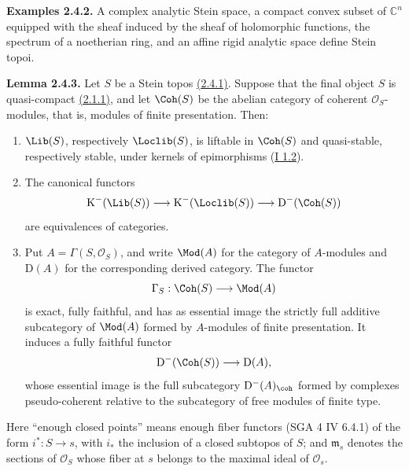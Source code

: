 \textbf{Examples 2.4.2.} A complex analytic Stein space, a compact convex subset of $\mathbb C^n$ equipped with the sheaf induced by the sheaf of holomorphic functions, the spectrum of a noetherian ring, and an affine rigid analytic space define Stein topoi.

\textbf{Lemma 2.4.3.} Let $S$ be a Stein topos \hyperlink{sga6.e02.def.2-4-1}{(2.4.1)}. Suppose that the final object $S$ is quasi-compact \hyperlink{sga6.e02.lem.2-1-1}{(2.1.1)}, and let $\Coh(S)$ be the abelian category of coherent $\mathcal O_S$-modules, that is, modules of finite presentation. Then:
\begin{enumerate}[label=\alph*)]
\item $\Lib(S)$, respectively $\Loclib(S)$, is liftable in $\Coh(S)$ and quasi-stable, respectively stable, under kernels of epimorphisms (\hyperlink{sga6.e01.sec.1.2}{I 1.2}).
\item The canonical functors
\[
\mathrm K^{-}(\Lib(S))\longrightarrow \mathrm K^{-}(\Loclib(S))\longrightarrow \mathrm D^{-}(\Coh(S))
\]
are equivalences of categories.
\item Put $A=\Gamma(S,\mathcal O_S)$, and write $\Mod(A)$ for the category of $A$-modules and $\mathrm D(A)$ for the corresponding derived category. The functor
\[
\Gamma_S:\Coh(S)\longrightarrow\Mod(A)
\]
is exact, fully faithful, and has as essential image the strictly full additive subcategory of $\Mod(A)$ formed by $A$-modules of finite presentation. It induces a fully faithful functor
\[
\mathrm D^{-}(\Coh(S))\longrightarrow\mathrm D(A),
\]
whose essential image is the full subcategory $\mathrm D^{-}(A)_{\coh}$ formed by complexes pseudo-coherent relative to the subcategory of free modules of finite type.
\end{enumerate}
Here ``enough closed points'' means enough fiber functors (SGA 4 IV 6.4.1) of the form $i^*:S\to s$, with $i_*$ the inclusion of a closed subtopos of $S$; and $\mathfrak m_s$ denotes the sections of $\mathcal O_S$ whose fiber at $s$ belongs to the maximal ideal of $\mathcal O_s$.

